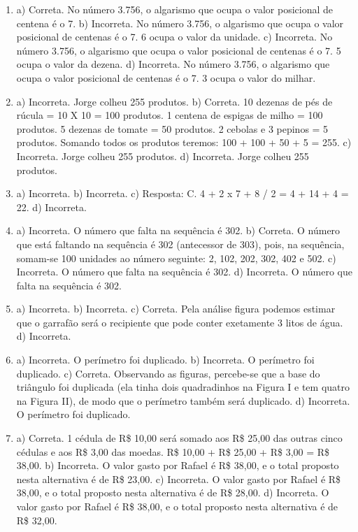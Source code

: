 \begin{enumerate}
\item
a) Correta. No número 3.756, o algarismo que ocupa o valor posicional
de centena é o 7.
b) Incorreta. No número 3.756, o algarismo que ocupa o valor posicional
de centenas é o 7. 6 ocupa o valor da unidade. 
c) Incorreta. No número 3.756, o algarismo que ocupa o valor posicional
de centenas é o 7. 5 ocupa o valor da dezena.
d) Incorreta. No número 3.756, o algarismo que ocupa o valor posicional
de centenas é o 7. 3 ocupa o valor do milhar.

\item
a) Incorreta. Jorge colheu 255 produtos. 
b) Correta. 10 dezenas de pés de rúcula = 10 X 10 = 100 produtos.
1 centena de espigas de milho = 100 produtos. 5 dezenas de tomate
= 50 produtos. 2 cebolas e 3 pepinos = 5 produtos. Somando todos os
produtos teremos: 100 + 100 + 50 + 5 = 255.
c) Incorreta. Jorge colheu 255 produtos.
d) Incorreta. Jorge colheu 255 produtos.

\item
a) Incorreta.
b) Incorreta.
c) Resposta: C. 4 + 2 x 7 + 8 / 2 = 4 + 14 + 4 = 22.
d) Incorreta.

\item
a) Incorreta. O número que falta na sequência é 302.
b) Correta. O número que está faltando na sequência é 302 (antecessor 
de 303), pois, na sequência, somam-se 100 unidades ao número seguinte: 
2, 102, 202, 302, 402 e 502.
c) Incorreta. O número que falta na sequência é 302.
d) Incorreta. O número que falta na sequência é 302.

\item
a) Incorreta. 
b) Incorreta.
c) Correta. Pela análise figura podemos estimar que o garrafão
será o recipiente que pode conter exetamente 3 litos de água.
d) Incorreta.

\item
a) Incorreta. O perímetro foi duplicado.
b) Incorreta. O perímetro foi duplicado.
c) Correta. Observando as figuras, percebe-se que a base do triângulo foi
duplicada (ela tinha dois quadradinhos na Figura I e tem quatro na Figura 
II), de modo que o perímetro também será duplicado.
d) Incorreta. O perímetro foi duplicado.

\item
a) Correta. 1 cédula de R\$ 10,00 será somado aos R\$ 25,00 das outras 
cinco cédulas e aos R\$ 3,00 das moedas. R\$ 10,00 + R\$ 25,00 + R\$ 3,00
= R\$ 38,00. 
b) Incorreta. O valor gasto por Rafael é R\$ 38,00, e o total proposto nesta alternativa é de R\$ 23,00.
c) Incorreta. O valor gasto por Rafael é R\$ 38,00, e o total proposto nesta alternativa é de R\$ 28,00.
d) Incorreta. O valor gasto por Rafael é R\$ 38,00, e o total proposto nesta alternativa é de R\$ 32,00.


\end{enumerate}
